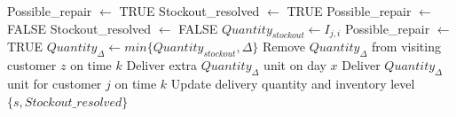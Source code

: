 \documentclass{article}
\begin{document}
\begin{algorithm}[H]
\caption{\textbf{Repair$(s, Stockout\_resolved)$}} \label{alg:QunatityRepair}
\begin{algorithmic}[1]
\STATE Possible\_repair $\gets$ TRUE
    \STATE Stockout\_resolved $\gets$ TRUE
    \STATE Possible\_repair $\gets$ FALSE
                \STATE Stockout\_resolved $\gets$ FALSE
                \STATE $Quantity_{stockout} \gets I_{j,i}$
                                            \STATE Possible\_repair $\gets$ TRUE
                                            \STATE $Quantity_{\Delta}\gets min\{Quantity_{stockout}, \Delta\}$
                                            \STATE Remove $Quantity_{\Delta}$ from visiting customer $z$ on time $k$
                                            \STATE Deliver extra $Quantity_{\Delta}$ unit on day $x$
                                            \STATE Deliver $Quantity_{\Delta}$ unit for customer $j$ on time $k$
                                            \STATE Update delivery quantity and inventory level 
                                        \ENDIF
                                    \ENDIF
                                \ENDFOR
                            \ENDIF
                        \ENDFOR                                    
                    \ENDIF
                \ENDFOR
            \ENDIF
        \ENDFOR
    \ENDFOR
\ENDWHILE
\RETURN $\{s,Stockout\_resolved\}$
\end{algorithmic}
\end{algorithm}

 

\end{document}
